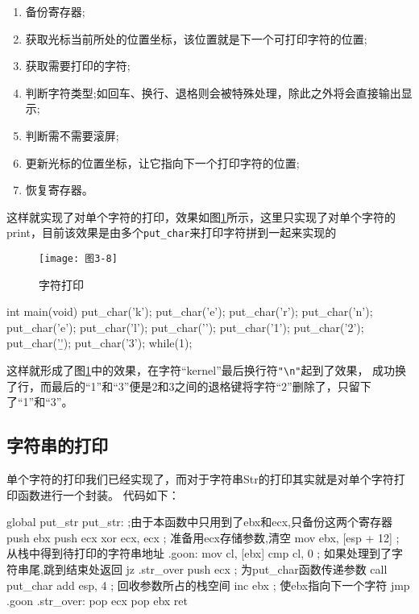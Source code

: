 \begin{enumerate}
\item 备份寄存器;
\item 获取光标当前所处的位置坐标，该位置就是下一个可打印字符的位置;
\item 获取需要打印的字符;
\item 判断字符类型;如回车、换行、退格则会被特殊处理，除此之外将会直接输出显示;
\item 判断需不需要滚屏;
\item 更新光标的位置坐标，让它指向下一个打印字符的位置;
\item 恢复寄存器。
\end{enumerate}
这样就实现了对单个字符的打印，效果如图\ref{fig:print_char}所示，这里只实现了对单个字符的
print，目前该效果是由多个\texttt{put\_char}来打印字符拼到一起来实现的

\begin{figure}[H]
  \centering
  \texttt{[image: 图3-8]}
  \caption{字符打印}
  \label{fig:print_char}
\end{figure}

\begin{codeblock}
\begin{ccode}
int main(void)
{
    put_char('k');
    put_char('e');
    put_char('r');
    put_char('n');
    put_char('e');
    put_char('l');
    put_char('\n');
    put_char('1');
    put_char('2');
    put_char('\b');
    put_char('3');
    while(1);
}
\end{ccode}
\end{codeblock}

这样就形成了图\ref{fig:print_char}中的效果，在字符“kernel”最后换行符\verb|"\n"|起到了效果，
成功换了行，而最后的“1”和“3”便是2和3之间的退格键将字符“2”删除了，只留下了“1”和“3”。

\subsection{字符串的打印}
\label{subsec:str}

单个字符的打印我们已经实现了，而对于字符串Str的打印其实就是对单个字符打印函数进行一个封装。
代码如下：

\begin{nasmcode}
global put_str
put_str:
;由于本函数中只用到了ebx和ecx,只备份这两个寄存器
   push ebx
   push ecx
   xor ecx, ecx		      ; 准备用ecx存储参数,清空
   mov ebx, [esp + 12]	      ; 从栈中得到待打印的字符串地址 
.goon:
   mov cl, [ebx]
   cmp cl, 0		      ; 如果处理到了字符串尾,跳到结束处返回
   jz .str_over
   push ecx		      ; 为put_char函数传递参数
   call put_char
   add esp, 4		      ; 回收参数所占的栈空间
   inc ebx		      ; 使ebx指向下一个字符
   jmp .goon
.str_over:
   pop ecx
   pop ebx
   ret
\end{nasmcode}

